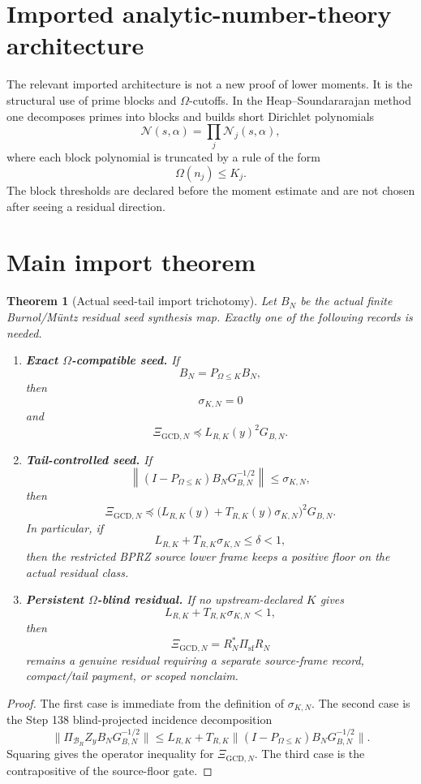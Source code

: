 \documentclass[11pt]{article}
\newtheorem{theorem}{Theorem}
\begin{document}
\section{Imported analytic-number-theory architecture}
The relevant imported architecture is not a new proof of lower moments.  It is the structural use of prime blocks and \(\Omega\)-cutoffs.  In the Heap--Soundararajan method one decomposes primes into blocks and builds short Dirichlet polynomials
\[
  \mathcal N(s,\alpha)=\prod_j \mathcal N_j(s,\alpha),
\]
where each block polynomial is truncated by a rule of the form
\[
  \Omega(n_j)\le K_j.
\]
The block thresholds are declared before the moment estimate and are not chosen after seeing a residual direction.

\section{Main import theorem}
\begin{theorem}[Actual seed-tail import trichotomy]
Let \(B_N\) be the actual finite Burnol/M\"untz residual seed synthesis map.  Exactly one of the following records is needed.

\begin{enumerate}[label=(\roman*)]
\item \textbf{Exact \(\Omega\)-compatible seed.}  If
\[
  B_N=P_{\Omega\le K}B_N,
\]
then
\[
  \sigma_{K,N}=0
\]
and
\[
  \Xi_{\mathrm{GCD},N}\preceq L_{R,K}(y)^2G_{B,N}.
\]

\item \textbf{Tail-controlled seed.}  If
\[
  \left\|
  (I-P_{\Omega\le K})B_NG_{B,N}^{-1/2}
  \right\|
  \le \sigma_{K,N},
\]
then
\[
  \Xi_{\mathrm{GCD},N}
  \preceq
  \bigl(L_{R,K}(y)+T_{R,K}(y)\sigma_{K,N}\bigr)^2G_{B,N}.
\]
In particular, if
\[
  L_{R,K}+T_{R,K}\sigma_{K,N}\le \delta<1,
\]
then the restricted BPRZ source lower frame keeps a positive floor on the actual residual class.

\item \textbf{Persistent \(\Omega\)-blind residual.}  If no upstream-declared \(K
\) gives
\[
  L_{R,K}+T_{R,K}\sigma_{K,N}<1,
\]
then
\[
  \Xi_{\mathrm{GCD},N}=R_N^*\Pi_{\mathrm{sf}}R_N
\]
remains a genuine residual requiring a separate source-frame record, compact/tail payment, or scoped nonclaim.
\end{enumerate}
\end{theorem}

\begin{proof}
The first case is immediate from the definition of \(\sigma_{K,N}\).  The second case is the Step 138 blind-projected incidence decomposition
\[
\|\Pi_{\mathcal B_R}Z_yB_NG_{B,N}^{-1/2}\|
\le
L_{R,K}+T_{R,K}\|(I-P_{\Omega\le K})B_NG_{B,N}^{-1/2}\|.
\]
Squaring gives the operator inequality for \(\Xi_{\mathrm{GCD},N}\).  The third case is the contrapositive of the source-floor gate.
\end{proof}
\end{document}
